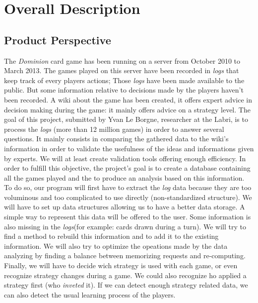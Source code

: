 \documentclass{scrreprt}
\begin{document}
\chapter{Overall Description}

\section{Product Perspective}
  The \textit{Dominion} card game has been running on a server from October 2010 to March 2013. The games played on this server have been recorded in \textit{logs} that keep track of every players actions; Those \textit{logs} have been made available to the public. But some information relative to decisions made by the players haven't been recorded.
  \newline A wiki about the game has been created, it offers expert advice in decision making during the game: it mainly offers advice on a strategy level. The goal of this project, submitted by Yvan Le Borgne, researcher at the Labri, is to process the \textit{logs} (more than 12 million games) in order to answer several questions. It mainly consists in comparing the gathered data to the wiki's information in order to validate the usefulness of the ideas and informations given by experts. We will at least create validation tools offering enough efficiency.
  In order to fulfill this objective, the project's goal is to create a database containing all the games played and the to produce an analysis based on this information.
  To do so, our program will first have to extract the \textit{log} data because they are too voluminous and too complicated to use directly (non-standardized structure). We will have to set up data structures allowing us to have a better data storage. A simple way to represent this data will be offered to the user.
  Some information is also missing in the \textit{logs}(for example: cards drawn during a turn). We will try to find a method to rebuild this information and to add it to the existing information.
  We will also try to optimize the opeations made by the data analyzing by finding a balance between memorizing requests and re-computing.
  Finally, we will have to decide wich strategy is used with each game, or even recognize strategy changes during a game. We could also recognize ho applied a strategy first (who \textit{inveted} it).
  If we can detect enough strategy related data, we can also detect the usual learning process of the players.
\end{document}
